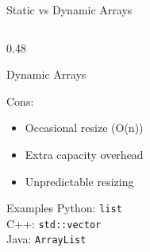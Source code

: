 \documentclass[aspectratio=169,xcolor=dvipsnames]{beamer}
\begin{document}
\begin{frame}{Static vs Dynamic Arrays}
\begin{columns}
\begin{column}{0.48\textwidth}
\begin{block}{Dynamic Arrays}
        \vspace{0.2cm}

        Cons:
        \begin{itemize}
          \item[$\times$] Occasional resize (O(n))
          \item[$\times$] Extra capacity overhead
          \item[$\times$] Unpredictable resizing
        \end{itemize}
      \end{block}

      \vspace{0.2cm}

      \begin{exampleblock}{Examples}
        Python: \texttt{list} \\
        C++: \texttt{std::vector} \\
        Java: \texttt{ArrayList}
      \end{exampleblock}
    \end{column}
  \end{columns}
\end{frame}
\end{document}

